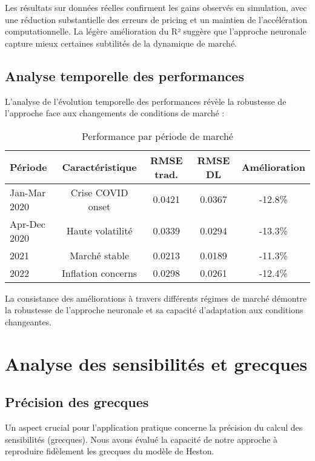 Les résultats sur données réelles confirment les gains observés en simulation, avec une réduction substantielle des erreurs de pricing et un maintien de l'accélération computationnelle. La légère amélioration du R² suggère que l'approche neuronale capture mieux certaines subtilités de la dynamique de marché.

\subsection{Analyse temporelle des performances}

L'analyse de l'évolution temporelle des performances révèle la robustesse de l'approche face aux changements de conditions de marché :

\begin{table}[H]
\centering
\caption{Performance par période de marché}
\begin{tabular}{@{}lcccc@{}}
\toprule
\textbf{Période} & \textbf{Caractéristique} & \textbf{RMSE trad.} & \textbf{RMSE DL} & \textbf{Amélioration} \\
\midrule
Jan-Mar 2020 & Crise COVID onset & 0.0421 & 0.0367 & -12.8\% \\
Apr-Dec 2020 & Haute volatilité & 0.0339 & 0.0294 & -13.3\% \\
2021 & Marché stable & 0.0213 & 0.0189 & -11.3\% \\
2022 & Inflation concerns & 0.0298 & 0.0261 & -12.4\% \\
\bottomrule
\end{tabular}
\end{table}

La consistance des améliorations à travers différents régimes de marché démontre la robustesse de l'approche neuronale et sa capacité d'adaptation aux conditions changeantes.

\section{Analyse des sensibilités et grecques}

\subsection{Précision des grecques}

Un aspect crucial pour l'application pratique concerne la précision du calcul des sensibilités (grecques). Nous avons évalué la capacité de notre approche à reproduire fidèlement les grecques du modèle de Heston.

